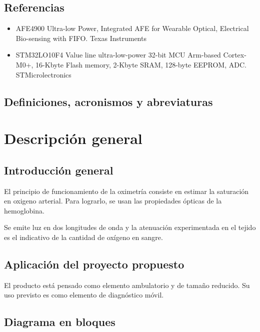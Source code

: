 \documentclass[
    11pt,
    spanish,
	a4paper
]{article}
\begin{document}
\subsection{Referencias}
\label{subsec:referencias}

\begin{itemize}
    \item AFE4900 Ultra-low Power, Integrated AFE for Wearable Optical, Electrical Bio-sensing with FIFO. Texas Instruments
    \item STM32LO10F4 Value line ultra-low-power 32-bit MCU Arm-based Cortex-M0+, 16-Kbyte Flash memory, 2-Kbyte SRAM, 128-byte EEPROM, ADC. STMicrolectronics
\end{itemize}

\subsection{Definiciones, acronismos y abreviaturas}
\label{subsec:definiciones}

\section{Descripción general}
\label{sec:descripcion}

\subsection{Introducción general}
\label{subsec:teorica}

El principio de funcionamiento de la oximetría consiste en estimar la saturación en oxigeno arterial.
Para lograrlo, se usan las propiedades ópticas de la hemoglobina.

Se emite luz en dos longitudes de onda y la atenuación experimentada en el tejido es el indicativo de la cantidad de oxígeno en sangre.

\subsection{Aplicación del proyecto propuesto}
\label{subsec:aplicacion}

El producto está pensado como elemento ambulatorio y de tamaño reducido.
Su uso previsto es como elemento de diagnóstico móvil.

\subsection{Diagrama en bloques}
\label{subsec:bloques}
\end{document}
